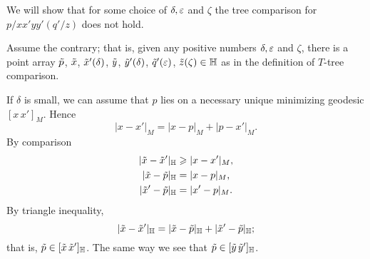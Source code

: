 \begin{wrapfigure}{r}{35 mm}
\end{wrapfigure}

We will  show that for some choice of $\delta,\eps$ and $\zeta$ the tree comparison for $p/xx'yy'(q'/z)$ does not hold.

Assume the contrary; that is, given any positive numbers $\delta,\eps$ and $\zeta$, there is a point array $\~p$, $\~x$, $\~x'(\delta)$, $\~y$, $\~y'(\delta)$, $\~q'(\eps)$, $\~z(\zeta)\in\HH$ as in the definition of $T$-tree comparison.

If $\delta$ is small, we can assume that $p$ lies on a necessary unique minimizing geodesic $[x\,x']_M$.
Hence 
\[|x-x'|_M=|x-p|_M+|p-x'|_M.\]
By comparison
\begin{align*}
|\~x-\~x'|_\HH&\ge|x-x'|_M,
\\
|\~x-\~p|_\HH&=|x-p|_M,
\\
|\~x'-\~p|_\HH&=|x'-p|_M.
\end{align*}
By triangle inequality,
\[|\~x-\~x'|_\HH=|\~x-\~p|_\HH+|\~x'-\~p|_\HH;\]
that is, $\~p\in [\~x\,\~x']_\HH$.
The same way we see that $\~p\in [\~y\,\~y']_\HH$.

